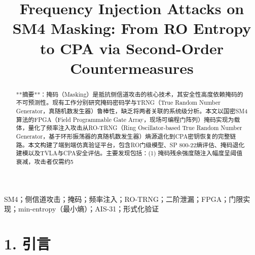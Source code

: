 \documentclass[journal]{IEEEtran}
\begin{document}
\title{Frequency Injection Attacks on SM4 Masking: From RO Entropy to CPA via Second-Order Countermeasures}

\maketitle

\begin{abstract}
**摘要**：掩码（Masking）是抵抗侧信道攻击的核心技术，其安全性高度依赖掩码的不可预测性。现有工作分别研究掩码密码学与TRNG（True Random Number Generator，真随机数发生器）鲁棒性，缺乏将两者关联的系统级分析。本文以国密SM4算法的FPGA（Field Programmable Gate Array，现场可编程门阵列）掩码实现为载体，量化了频率注入攻击从RO-TRNG（Ring Oscillator-based True Random Number Generator，基于环形振荡器的真随机数发生器）熵源退化到CPA密钥恢复的完整链路。本文构建了端到端仿真验证平台，包含RO门级模型、SP 800-22熵评估、掩码退化建模以及TVLA与CPA安全评估。主要发现包括：(1) 掩码残余强度随注入幅度呈阈值衰减，攻击者仅需约5%
\end{abstract}


\begin{IEEEkeywords}
SM4；侧信道攻击；掩码；频率注入；RO-TRNG；二阶泄漏；FPGA；门限实现；min-entropy（最小熵）；AIS-31；形式化验证
\end{IEEEkeywords}



\section{1. 引言}
\end{document}
